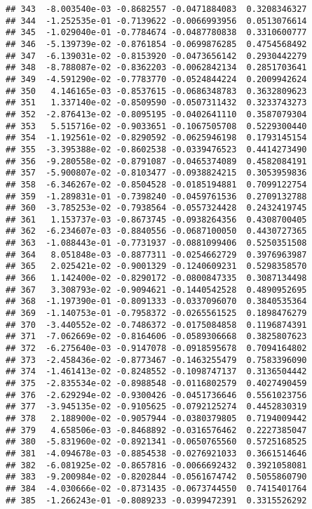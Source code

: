 \documentclass[
]{article}
\begin{document}
\begin{verbatim}
## 343  -8.003540e-03 -0.8682557 -0.0471884083  0.3208346327
## 344  -1.252535e-01 -0.7139622 -0.0066993956  0.0513076614
## 345  -1.029040e-01 -0.7784674 -0.0487780838  0.3310600777
## 346  -5.139739e-02 -0.8761854 -0.0699876285  0.4754568492
## 347  -6.139031e-02 -0.8153920 -0.0473656142  0.2930442279
## 348  -8.788087e-02 -0.8362203 -0.0062842134  0.2851703641
## 349  -4.591290e-02 -0.7783770 -0.0524844224  0.2009942624
## 350   4.146165e-03 -0.8537615 -0.0686348783  0.3632809623
## 351   1.337140e-02 -0.8509590 -0.0507311432  0.3233743273
## 352  -2.876413e-02 -0.8095195 -0.0402641110  0.3587079304
## 353   5.515716e-02 -0.9033651 -0.1067505708  0.5229300440
## 354  -1.192561e-02 -0.8290592 -0.0625946198  0.1793145154
## 355  -3.395388e-02 -0.8602538 -0.0339476523  0.4414273490
## 356  -9.280558e-02 -0.8791087 -0.0465374089  0.4582084191
## 357  -5.900807e-02 -0.8103477 -0.0938824215  0.3053959836
## 358  -6.346267e-02 -0.8504528 -0.0185194881  0.7099122754
## 359  -1.289831e-01 -0.7398240 -0.0459761536  0.2709132788
## 360  -3.785253e-02 -0.7938564 -0.0557324428  0.2432419745
## 361   1.153737e-03 -0.8673745 -0.0938264356  0.4308700405
## 362  -6.234607e-03 -0.8840556 -0.0687100050  0.4430727365
## 363  -1.088443e-01 -0.7731937 -0.0881099406  0.5250351508
## 364   8.051848e-03 -0.8877311 -0.0254662729  0.3976963987
## 365   2.025421e-02 -0.9001329 -0.1240609231  0.5298358570
## 366   1.142400e-02 -0.8290172 -0.0800847335  0.3087134498
## 367   3.308793e-02 -0.9094621 -0.1440542528  0.4890952695
## 368  -1.197390e-01 -0.8091333 -0.0337096070  0.3840535364
## 369  -1.140753e-01 -0.7958372 -0.0265561525  0.1898476279
## 370  -3.440552e-02 -0.7486372 -0.0175084858  0.1196874391
## 371  -7.062669e-02 -0.8164606 -0.0589306668  0.3825807623
## 372  -6.275640e-03 -0.9147078 -0.0918595678  0.7094164802
## 373  -2.458436e-02 -0.8773467 -0.1463255479  0.7583396090
## 374  -1.461413e-02 -0.8248552 -0.1098747137  0.3136504442
## 375  -2.835534e-02 -0.8988548 -0.0116802579  0.4027490459
## 376  -2.629294e-02 -0.9300426 -0.0451736646  0.5561023756
## 377  -3.945135e-02 -0.9105625 -0.0792125274  0.4452830319
## 378   2.188900e-02 -0.9057944 -0.0380379805  0.7194009442
## 379   4.658506e-03 -0.8468892 -0.0316576462  0.2227385047
## 380  -5.831960e-02 -0.8921341 -0.0650765560  0.5725168525
## 381  -4.094678e-03 -0.8854538 -0.0276921033  0.3661514646
## 382  -6.081925e-02 -0.8657816 -0.0066692432  0.3921058081
## 383  -9.200984e-02 -0.8202844 -0.0561674742  0.5055860790
## 384  -4.030666e-02 -0.8731435 -0.0673744550  0.7415401764
## 385  -1.266243e-01 -0.8089233 -0.0399472391  0.3315526292

\end{verbatim}
\end{document}
